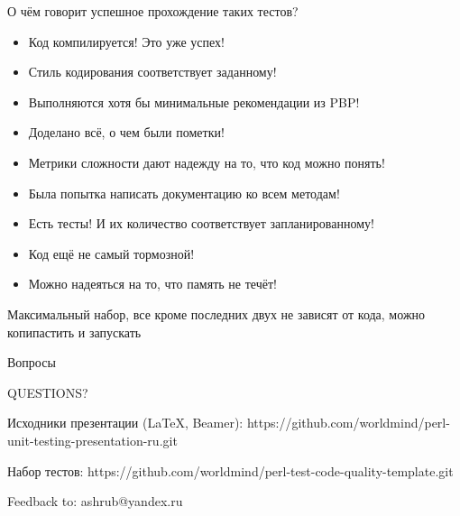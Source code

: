 \documentclass[aspectratio=169]{beamer}
\begin{document}
\begin{frame}{О чём говорит успешное прохождение таких тестов?}
\begin{itemize}
\item Код компилируется! Это уже успех!
\item Стиль кодирования соответствует заданному!
\item Выполняются хотя бы минимальные рекомендации из PBP!
\item Доделано всё, о чем были пометки!
\item Метрики сложности дают надежду на то, что код можно понять!
\item Была попытка написать документацию ко всем методам!
\item Есть тесты! И их количество соответствует запланированному!
\item Код ещё не самый тормозной!
\item Можно надеяться на то, что память не течёт!
\end{itemize}
\end{frame}

\begin{frame}{}
Максимальный набор, все кроме последних двух не зависят от кода, можно копипастить и запускать
\end{frame}

\begin{frame}{Вопросы}

\begin{center}
\LARGE QUESTIONS?
\end{center}

\begin{block}{Исходники презентации (LaTeX, Beamer):}
https://github.com/worldmind/perl-unit-testing-presentation-ru.git
\end{block}

\begin{block}{Набор тестов:}
https://github.com/worldmind/perl-test-code-quality-template.git
\end{block}

\begin{block}{Feedback to:}
ashrub@yandex.ru
\end{block}

\end{frame}
\end{document}
